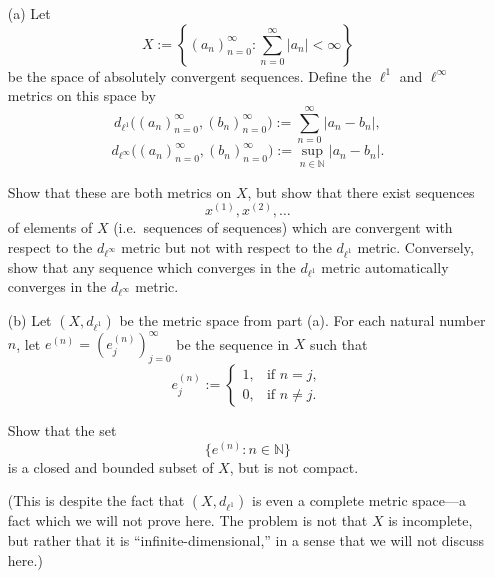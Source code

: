 \begin{problem}[16pts]
  \vphantom{text}
  \begin{enumerate}
  \item[(a)] Let
\[
X := \left\{ (a_n)_{n=0}^\infty : \sum_{n=0}^\infty |a_n| < \infty \right\}
\]
be the space of absolutely convergent sequences. Define the $\ell^1$ and $\ell^\infty$ metrics on this space by
\[
d_{\ell^1}\big((a_n)_{n=0}^\infty,(b_n)_{n=0}^\infty\big)
:= \sum_{n=0}^\infty |a_n - b_n|,
\]
\[
d_{\ell^\infty}\big((a_n)_{n=0}^\infty,(b_n)_{n=0}^\infty\big)
:= \sup_{n\in\mathbb{N}} |a_n - b_n|.
\]

Show that these are both metrics on $X$, but show that there exist sequences 
\[
x^{(1)}, x^{(2)}, \dots
\]
of elements of $X$ (i.e.\ sequences of sequences) which are convergent with respect to the $d_{\ell^\infty}$ metric but not with respect to the $d_{\ell^1}$ metric. Conversely, show that any sequence which converges in the $d_{\ell^1}$ metric automatically converges in the $d_{\ell^\infty}$ metric.


 \item[(b)] Let $(X,d_{\ell^1})$ be the metric space from part (a).  
For each natural number $n$, let $e^{(n)} = (e^{(n)}_j)_{j=0}^\infty$ be the sequence in $X$ such that  
\[
e^{(n)}_j := 
\begin{cases}
1, & \text{if } n=j,\\
0, & \text{if } n\neq j.
\end{cases}
\]

Show that the set
\[
\{ e^{(n)} : n \in \mathbb{N} \}
\]
is a closed and bounded subset of $X$, but is not compact.  

(This is despite the fact that $(X,d_{\ell^1})$ is even a complete metric space---a fact which we will not prove here.  
The problem is not that $X$ is incomplete, but rather that it is ``infinite-dimensional,'' in a sense that we will not discuss here.)

 
  \end{enumerate}
\end{problem}
